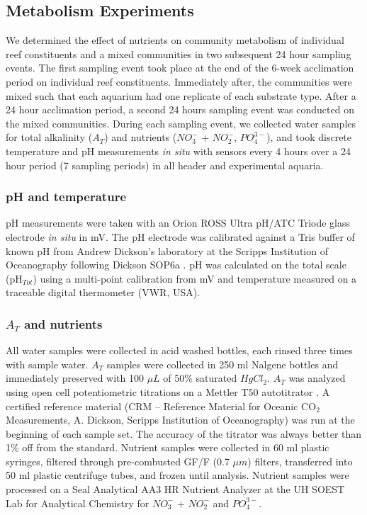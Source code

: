 \documentclass{article}%
\begin{document}
\subsection{Metabolism Experiments}
We determined the effect of nutrients on community metabolism of individual reef constituents and a mixed communities in  two subsequent 24 hour sampling events. The first sampling event took place at the end of the 6-week acclimation period on individual reef constituents. Immediately after, the communities were mixed such that each aquarium had one replicate of each substrate type. After a 24 hour acclimation period, a second 24 hours sampling event was conducted on the mixed communities. During each sampling event, we collected water samples for total alkalinity ($A_{T}$) and nutrients ($NO_{3}^{-}$ + $NO_{2}^{-}$, $PO_{4}^{3-}$), and took discrete temperature and pH measurements \textit{in situ} with sensors every 4 hours over a 24 hour period (7 sampling periods) in all header and experimental aquaria.
  
\subsubsection{pH and temperature}
pH measurements were taken with an Orion ROSS Ultra pH/ATC Triode glass electrode \textit{in situ} in mV. The pH electrode was calibrated against a Tris buffer of known pH from Andrew Dickson's laboratory at the Scripps Institution of Oceanography following Dickson SOP6a \cite{Dickson2007}. pH was calculated on the total scale (pH$_{Tot}$) using a multi-point calibration from mV and temperature measured on a traceable digital thermometer (VWR, USA).

\subsubsection{$A_{T}$ and nutrients}
All water samples were collected in acid washed bottles, each rinsed three times with sample water. $A_{T}$ samples were collected in 250 ml Nalgene bottles and immediately preserved with 100 $\mu L$ of 50\% saturated $HgCl_{2}$. $A_{T}$ was analyzed using open cell potentiometric titrations on a Mettler T50 autotitrator \cite{Dickson2007}. A certified reference material (CRM -- Reference Material for Oceanic CO$_2$ Measurements, A. Dickson, Scripps Institution of Oceanography) was run at the beginning of each sample set. The accuracy of the titrator was always better than 1\% off from the standard. Nutrient samples were collected in 60 ml plastic syringes, filtered through pre-combusted GF/F (0.7 $\mu m$) filters, transferred into 50 ml plastic centrifuge tubes, and frozen until analysis. Nutrient samples were processed on a Seal Analytical AA3 HR Nutrient Analyzer at the UH SOEST Lab for Analytical Chemistry for $NO_{3}^{-}$ + $NO_{2}^{-}$ and $PO_{4}^{3-}$.  
\end{document}
